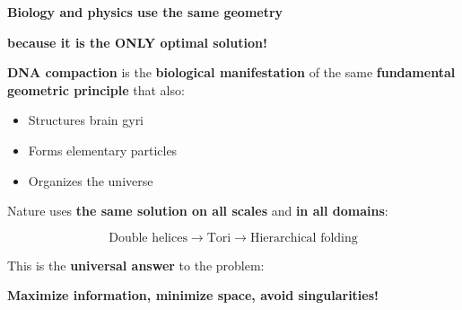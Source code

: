 	\begin{revolutionary}[The Truth]
		
		\begin{center}
			\textbf{Biology and physics use the same geometry}
			
			\vspace{0.3cm}
			
			\textbf{because it is the ONLY optimal solution!}
		\end{center}
		
		\normalsize
		
		\vspace{0.3cm}
		
		\textbf{DNA compaction} is the \textbf{biological manifestation} of the same \textbf{fundamental geometric principle} that also:
		
		\begin{itemize}
			\item Structures brain gyri
			\item Forms elementary particles
			\item Organizes the universe
		\end{itemize}
		
		\vspace{0.3cm}
		
		Nature uses \textbf{the same solution on all scales} and \textbf{in all domains}:
		
		\begin{equation}
			\boxed{\text{Double helices} \to \text{Tori} \to \text{Hierarchical folding}}
		\end{equation}
		
		\vspace{0.3cm}
		
		This is the \textbf{universal answer} to the problem: 
		
		\textbf{Maximize information, minimize space, avoid singularities!}
	\end{revolutionary}
	